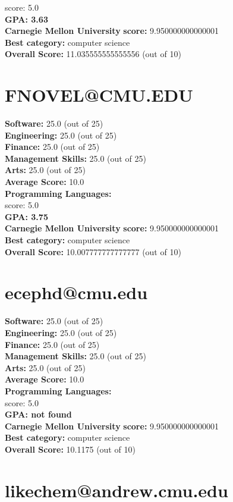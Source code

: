 \documentclass{article}
\begin{document}
score: 5.0\\
\textbf{GPA: 3.63}\\
\textbf{Carnegie Mellon University} \textbf{score:} 9.950000000000001\\
\textbf{Best category: } computer science\\
    \textbf{Overall Score: }11.035555555555556 (out of 10)\section{FNOVEL@CMU.EDU}
\textbf{Software:} 25.0 (out of 25)\\
    \textbf{Engineering: } 25.0 (out of 25)\\
    \textbf{Finance:} 25.0 (out of 25)\\
    \textbf{Management Skills:} 25.0 (out of 25)\\
    \textbf{Arts:} 25.0 (out of 25)\\
\textbf{Average Score: } 10.0\\
\textbf{Programming Languages:} \\
score: 5.0\\
\textbf{GPA: 3.75}\\
\textbf{Carnegie Mellon University} \textbf{score:} 9.950000000000001\\
\textbf{Best category: } computer science\\
    \textbf{Overall Score: }10.007777777777777 (out of 10)\section{ecephd@cmu.edu}
\textbf{Software:} 25.0 (out of 25)\\
    \textbf{Engineering: } 25.0 (out of 25)\\
    \textbf{Finance:} 25.0 (out of 25)\\
    \textbf{Management Skills:} 25.0 (out of 25)\\
    \textbf{Arts:} 25.0 (out of 25)\\
\textbf{Average Score: } 10.0\\
\textbf{Programming Languages:} \\
score: 5.0\\
\textbf{GPA: not found}\\
\textbf{Carnegie Mellon University} \textbf{score:} 9.950000000000001\\
\textbf{Best category: } computer science\\
    \textbf{Overall Score: }10.1175 (out of 10)\section{likechem@andrew.cmu.edu}
\end{document}
